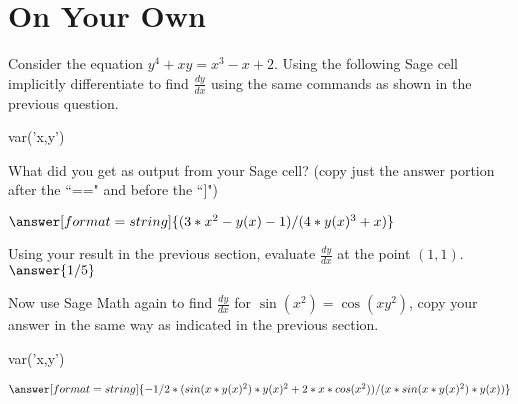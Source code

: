 \documentclass{ximera}
\begin{document}
\section{On Your Own}
Consider the equation $y^4+xy=x^3-x+2$. Using the following Sage cell implicitly differentiate to find $\frac{dy}{dx}$ using the same commands as shown in the previous question.
\begin{onlineOnly}
\begin{sageCell}
var('x,y')
\end{sageCell}
\end{onlineOnly}
\begin{question}
What did you get as output from your Sage cell? (copy just the answer portion after the ``==" and before the ``]")

$\answer[format=string]{(3*x^2 - y(x) - 1)/(4*y(x)^3 + x)}$
\end{question}
\begin{question}
Using your result in the previous section, evaluate $\frac{dy}{dx}$ at the point $(1,1)$.
$\answer{1/5}$
\end{question}
\begin{question}
Now use Sage Math again to find $\frac{dy}{dx}$ for  $\sin(x^2)=\cos(xy^2)$, copy your answer in the same way as indicated in the previous section.
\begin{onlineOnly}
\begin{sageCell}
var('x,y')
\end{sageCell}
\end{onlineOnly}
$\answer[format=string]{-1/2*(sin(x*y(x)^2)*y(x)^2 + 2*x*cos(x^2))/(x*sin(x*y(x)^2)*y(x))}$
\end{question}
\end{document}
